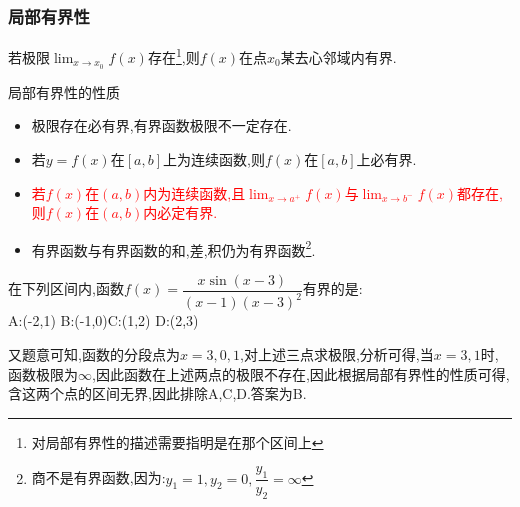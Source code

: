 \documentclass[9pt a4paper, oneside, UTF8]{ctexbook}
\begin{document}
\begin{sloppypar}
    \subsubsection{局部有界性}
    \begin{them}{}{}
        若极限$\lim_{x \to x_0}f(x)$存在\footnote{对局部有界性的描述需要指明是在那个区间上},则$f(x)$在点$x_0$某去心邻域内有界.
    \end{them}
    \begin{criterion}{局部有界性的性质}{}
        \begin{itemize}
            \item 极限存在必有界,有界函数极限不一定存在.
            \item 若$y=f(x)$在$[a,b]$上为连续函数,则$f(x)$在$[a,b]$上必有界.
            \item \textcolor{red}{若$f(x)$在$(a,b)$内为连续函数,且$\lim_{x \to a^+}f(x)$与$\lim_{x\to b^-}f(x)$都存在,则$f(x)$在$(a,b)$内必定有界.}
            \item 有界函数与有界函数的和,差,积仍为有界函数\footnote{商不是有界函数,因为:$y_1=1,y_2=0,\dfrac{y_1}{y_2}=\infty$}.
        \end{itemize}
    \end{criterion}
    \begin{problem}
    在下列区间内,函数$f(x)={\dfrac{x\sin(x-3)}{(x-1)(x-3)^{2}}}$有界的是:\\
    A:(-2,1) \qquad  B:(-1,0)\qquad C:(1,2) \qquad D:(2,3)
    \end{problem}
    \begin{solution}
        又题意可知,函数的分段点为$x=3,0,1$,对上述三点求极限,分析可得,当$x=3,1$时,函数极限为$\infty$,因此函数在上述两点的极限不存在,因此根据局部有界性的性质可得,含这两个点的区间无界,因此排除A,C,D.答案为B.
    \end{solution}

\end{sloppypar}
\end{document}
